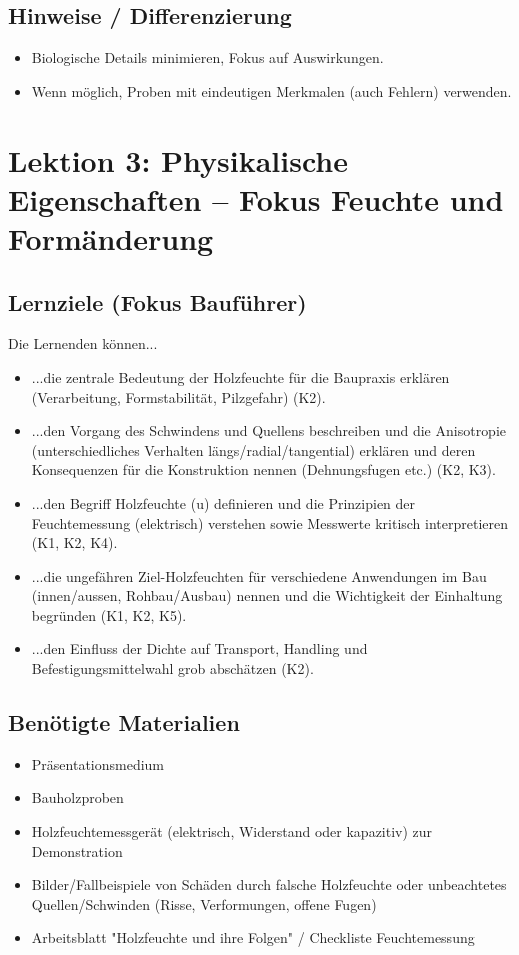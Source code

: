 \documentclass[12pt, a4paper]{article}
\begin{document}
\subsection{Hinweise / Differenzierung}
\begin{itemize}
    \item Biologische Details minimieren, Fokus auf Auswirkungen.
    \item Wenn möglich, Proben mit eindeutigen Merkmalen (auch Fehlern) verwenden.
\end{itemize}

\newpage

\section{Lektion 3: Physikalische Eigenschaften – Fokus Feuchte und Formänderung}
\subsection{Lernziele (Fokus Bauführer)}
Die Lernenden können...
\begin{itemize}
    \item ...die zentrale Bedeutung der Holzfeuchte für die Baupraxis erklären (Verarbeitung, Formstabilität, Pilzgefahr) (K2).
    \item ...den Vorgang des Schwindens und Quellens beschreiben und die Anisotropie (unterschiedliches Verhalten längs/radial/tangential) erklären und deren Konsequenzen für die Konstruktion nennen (Dehnungsfugen etc.) (K2, K3).
    \item ...den Begriff Holzfeuchte (u) definieren und die Prinzipien der Feuchtemessung (elektrisch) verstehen sowie Messwerte kritisch interpretieren (K1, K2, K4).
    \item ...die ungefähren Ziel-Holzfeuchten für verschiedene Anwendungen im Bau (innen/aussen, Rohbau/Ausbau) nennen und die Wichtigkeit der Einhaltung begründen (K1, K2, K5).
    \item ...den Einfluss der Dichte auf Transport, Handling und Befestigungsmittelwahl grob abschätzen (K2).
\end{itemize}

\subsection{Benötigte Materialien}
\begin{itemize}
    \item Präsentationsmedium
    \item Bauholzproben
    \item Holzfeuchtemessgerät (elektrisch, Widerstand oder kapazitiv) zur Demonstration
    \item Bilder/Fallbeispiele von Schäden durch falsche Holzfeuchte oder unbeachtetes Quellen/Schwinden (Risse, Verformungen, offene Fugen)
    \item Arbeitsblatt "Holzfeuchte und ihre Folgen" / Checkliste Feuchtemessung
\end{itemize}
\end{document}
